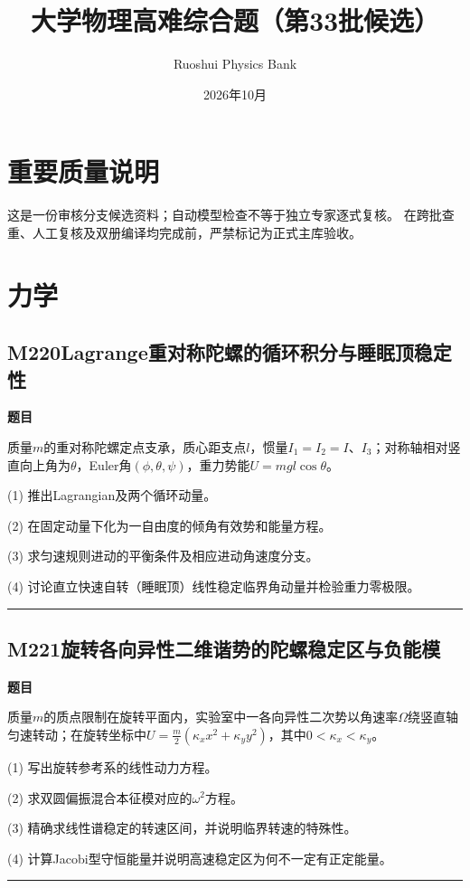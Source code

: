 \documentclass[UTF8,a4paper,11pt,oneside,openany]{ctexbook}
\begin{document}
\title{大学物理高难综合题（第33批候选）}
\author{Ruoshui Physics Bank}
\date{2026年10月}
\maketitle
\tableofcontents
\chapter*{重要质量说明}
这是一份审核分支候选资料；自动模型检查不等于独立专家逐式复核。
在跨批查重、人工复核及双册编译均完成前，严禁标记为正式主库验收。

\chapter{力学}
\section*{M220\quad Lagrange重对称陀螺的循环积分与睡眠顶稳定性}
\textbf{题目}\par
质量$m$的重对称陀螺定点支承，质心距支点$l$，惯量$I_1=I_2=I$、$I_3$；对称轴相对竖直向上角为$\theta$，Euler角$(\phi,\theta,\psi)$，重力势能$U=mgl\cos\theta$。
\par\smallskip\noindent (1) 推出Lagrangian及两个循环动量。
\par\smallskip\noindent (2) 在固定动量下化为一自由度的倾角有效势和能量方程。
\par\smallskip\noindent (3) 求匀速规则进动的平衡条件及相应进动角速度分支。
\par\smallskip\noindent (4) 讨论直立快速自转（睡眠顶）线性稳定临界角动量并检验重力零极限。
\par\medskip\hrule\medskip
\section*{M221\quad 旋转各向异性二维谐势的陀螺稳定区与负能模}
\textbf{题目}\par
质量$m$的质点限制在旋转平面内，实验室中一各向异性二次势以角速率$\Omega$绕竖直轴匀速转动；在旋转坐标中$U=\frac m2(\kappa_x x^2+\kappa_y y^2)$，其中$0<\kappa_x<\kappa_y$。
\par\smallskip\noindent (1) 写出旋转参考系的线性动力方程。
\par\smallskip\noindent (2) 求双圆偏振混合本征模对应的$\omega^2$方程。
\par\smallskip\noindent (3) 精确求线性谱稳定的转速区间，并说明临界转速的特殊性。
\par\smallskip\noindent (4) 计算Jacobi型守恒能量并说明高速稳定区为何不一定有正定能量。
\par\medskip\hrule\medskip
\end{document}
